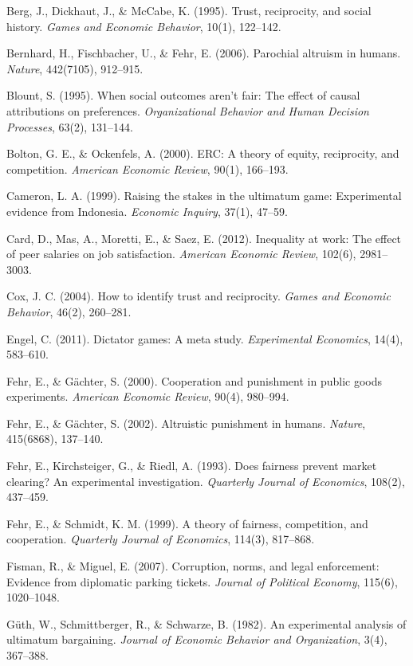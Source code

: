 \documentclass[12pt, letterpaper]{article}
\begin{document}
Berg, J., Dickhaut, J., \& McCabe, K. (1995). Trust, reciprocity, and social history. \textit{Games and Economic Behavior}, 10(1), 122--142.

Bernhard, H., Fischbacher, U., \& Fehr, E. (2006). Parochial altruism in humans. \textit{Nature}, 442(7105), 912--915.

Blount, S. (1995). When social outcomes aren't fair: The effect of causal attributions on preferences. \textit{Organizational Behavior and Human Decision Processes}, 63(2), 131--144.

Bolton, G. E., \& Ockenfels, A. (2000). ERC: A theory of equity, reciprocity, and competition. \textit{American Economic Review}, 90(1), 166--193.

Cameron, L. A. (1999). Raising the stakes in the ultimatum game: Experimental evidence from Indonesia. \textit{Economic Inquiry}, 37(1), 47--59.

Card, D., Mas, A., Moretti, E., \& Saez, E. (2012). Inequality at work: The effect of peer salaries on job satisfaction. \textit{American Economic Review}, 102(6), 2981--3003.

Cox, J. C. (2004). How to identify trust and reciprocity. \textit{Games and Economic Behavior}, 46(2), 260--281.

Engel, C. (2011). Dictator games: A meta study. \textit{Experimental Economics}, 14(4), 583--610.

Fehr, E., \& Gächter, S. (2000). Cooperation and punishment in public goods experiments. \textit{American Economic Review}, 90(4), 980--994.

Fehr, E., \& Gächter, S. (2002). Altruistic punishment in humans. \textit{Nature}, 415(6868), 137--140.

Fehr, E., Kirchsteiger, G., \& Riedl, A. (1993). Does fairness prevent market clearing? An experimental investigation. \textit{Quarterly Journal of Economics}, 108(2), 437--459.

Fehr, E., \& Schmidt, K. M. (1999). A theory of fairness, competition, and cooperation. \textit{Quarterly Journal of Economics}, 114(3), 817--868.

Fisman, R., \& Miguel, E. (2007). Corruption, norms, and legal enforcement: Evidence from diplomatic parking tickets. \textit{Journal of Political Economy}, 115(6), 1020--1048.

Güth, W., Schmittberger, R., \& Schwarze, B. (1982). An experimental analysis of ultimatum bargaining. \textit{Journal of Economic Behavior and Organization}, 3(4), 367--388.
\end{document}
